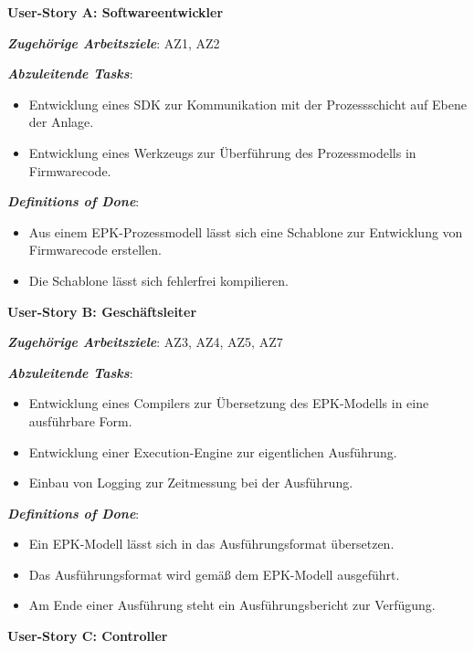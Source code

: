 \noindent \textbf{User-Story A: Softwareentwickler}

\textbf{\textit{Zugehörige Arbeitsziele}}: AZ1, AZ2

\textbf{\textit{Abzuleitende Tasks}}:

\begin{itemize}
    \item Entwicklung eines \ac{SDK} zur Kommunikation mit der Prozessschicht auf Ebene der Anlage.
    \item Entwicklung eines Werkzeugs zur Überführung des Prozessmodells in Firmwarecode.
\end{itemize}

\newpage

\textbf{\textit{Definitions of Done}}:

\begin{itemize}
    \item Aus einem EPK-Prozessmodell lässt sich eine Schablone zur Entwicklung von Firmwarecode erstellen.
    \item Die Schablone lässt sich fehlerfrei kompilieren.
\end{itemize}


\noindent \textbf{User-Story B: Geschäftsleiter}

\textbf{\textit{Zugehörige Arbeitsziele}}: AZ3, AZ4, AZ5, AZ7

\textbf{\textit{Abzuleitende Tasks}}:

\begin{itemize}
    \item Entwicklung eines Compilers zur Übersetzung des EPK-Modells in eine ausführbare Form.
    \item Entwicklung einer Execution-Engine zur eigentlichen Ausführung.
    \item Einbau von Logging zur Zeitmessung bei der Ausführung.
\end{itemize}

\textbf{\textit{Definitions of Done}}:

\begin{itemize}
    \item Ein EPK-Modell lässt sich in das Ausführungsformat übersetzen.
    \item Das Ausführungsformat wird gemäß dem EPK-Modell ausgeführt.
    \item Am Ende einer Ausführung steht ein Ausführungsbericht zur Verfügung.
\end{itemize}


\noindent \textbf{User-Story C: Controller}

